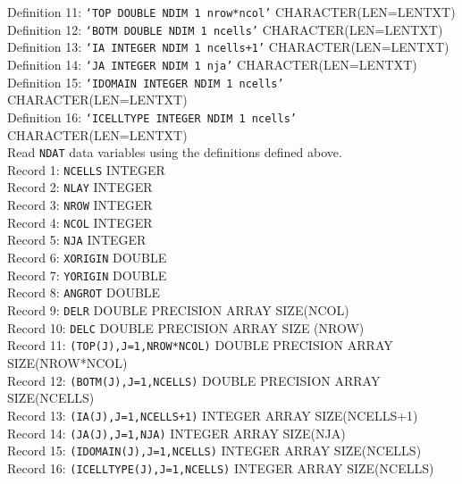\noindent Definition 11: \texttt{`TOP DOUBLE NDIM 1 nrow*ncol'} {\color{red} \footnotesize{CHARACTER(LEN=LENTXT)}} \\
\noindent Definition 12: \texttt{`BOTM DOUBLE NDIM 1 ncells'} {\color{red} \footnotesize{CHARACTER(LEN=LENTXT)}} \\
\noindent Definition 13: \texttt{`IA INTEGER NDIM 1 ncells+1'} {\color{red} \footnotesize{CHARACTER(LEN=LENTXT)}} \\
\noindent Definition 14: \texttt{`JA INTEGER NDIM 1 nja'} {\color{red} \footnotesize{CHARACTER(LEN=LENTXT)}} \\
\noindent Definition 15: \texttt{`IDOMAIN INTEGER NDIM 1 ncells'} {\color{red} \footnotesize{CHARACTER(LEN=LENTXT)}} \\
\noindent Definition 16: \texttt{`ICELLTYPE INTEGER NDIM 1 ncells'} {\color{red} \footnotesize{CHARACTER(LEN=LENTXT)}} \\

\vspace{5mm}
\noindent Read \texttt{NDAT} data variables using the definitions defined above. \\
\noindent Record 1: \texttt{NCELLS} {\color{red} \footnotesize{INTEGER}} \\
\noindent Record 2: \texttt{NLAY} {\color{red} \footnotesize{INTEGER}} \\
\noindent Record 3: \texttt{NROW} {\color{red} \footnotesize{INTEGER}} \\
\noindent Record 4: \texttt{NCOL} {\color{red} \footnotesize{INTEGER}} \\
\noindent Record 5: \texttt{NJA} {\color{red} \footnotesize{INTEGER}} \\
\noindent Record 6: \texttt{XORIGIN} {\color{red} \footnotesize{DOUBLE}} \\
\noindent Record 7: \texttt{YORIGIN} {\color{red} \footnotesize{DOUBLE}} \\
\noindent Record 8: \texttt{ANGROT} {\color{red} \footnotesize{DOUBLE}} \\
\noindent Record 9: \texttt{DELR} {\color{red} \footnotesize{DOUBLE PRECISION ARRAY SIZE(NCOL)}} \\
\noindent Record 10: \texttt{DELC} {\color{red} \footnotesize{DOUBLE PRECISION ARRAY SIZE (NROW)}} \\
\noindent Record 11: \texttt{(TOP(J),J=1,NROW*NCOL)} {\color{red} \footnotesize{DOUBLE PRECISION ARRAY SIZE(NROW*NCOL)}} \\
\noindent Record 12: \texttt{(BOTM(J),J=1,NCELLS)} {\color{red} \footnotesize{DOUBLE PRECISION ARRAY SIZE(NCELLS)}} \\
\noindent Record 13: \texttt{(IA(J),J=1,NCELLS+1)} {\color{red} \footnotesize{INTEGER ARRAY SIZE(NCELLS+1)}} \\
\noindent Record 14: \texttt{(JA(J),J=1,NJA)} {\color{red} \footnotesize{INTEGER ARRAY SIZE(NJA)}} \\
\noindent Record 15: \texttt{(IDOMAIN(J),J=1,NCELLS)} {\color{red} \footnotesize{INTEGER ARRAY SIZE(NCELLS)}} \\
\noindent Record 16: \texttt{(ICELLTYPE(J),J=1,NCELLS)} {\color{red} \footnotesize{INTEGER ARRAY SIZE(NCELLS)}} \\

